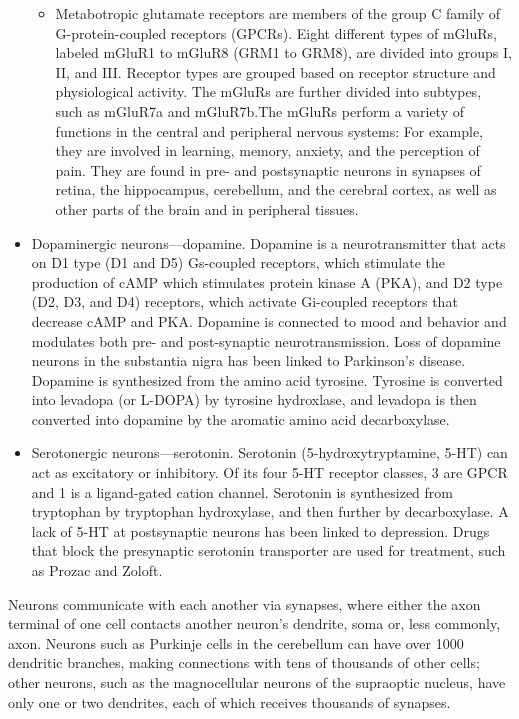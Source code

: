 \begin{itemize}
\begin{itemize}
  \item
    Metabotropic glutamate receptors are members of the group C family of G-protein-coupled receptors (GPCRs).
    Eight different types of mGluRs, labeled mGluR1 to mGluR8 (GRM1 to GRM8), are divided into groups I, II, and III. Receptor types are grouped based on receptor structure and physiological activity. The mGluRs are further divided into subtypes, such as mGluR7a and mGluR7b.The mGluRs perform a variety of functions in the central and peripheral nervous systems: For example, they are involved in learning, memory, anxiety, and the perception of pain. They are found in pre- and postsynaptic neurons in synapses of retina, the hippocampus, cerebellum, and the cerebral cortex, as well as other parts of the brain and in peripheral tissues.
  \end{itemize}
\item
  Dopaminergic neurons---dopamine. Dopamine is a neurotransmitter that acts on D1 type (D1 and D5) Gs-coupled receptors, which stimulate the production of cAMP which stimulates protein kinase A (PKA), and D2 type (D2, D3, and D4) receptors, which activate Gi-coupled receptors that decrease cAMP and PKA. Dopamine is connected to mood and behavior and modulates both pre- and post-synaptic neurotransmission. Loss of dopamine neurons in the substantia nigra has been linked to Parkinson's disease. Dopamine is synthesized from the amino acid tyrosine. Tyrosine is converted into levadopa (or L-DOPA) by tyrosine hydroxlase, and levadopa is then converted into dopamine by the aromatic amino acid decarboxylase.
\item
  Serotonergic neurons---serotonin. Serotonin (5-hydroxytryptamine, 5-HT) can act as excitatory or inhibitory. Of its four 5-HT receptor classes, 3 are GPCR and 1 is a ligand-gated cation channel. Serotonin is synthesized from tryptophan by tryptophan hydroxylase, and then further by decarboxylase. A lack of 5-HT at postsynaptic neurons has been linked to depression. Drugs that block the presynaptic serotonin transporter are used for treatment, such as Prozac and Zoloft.
\end{itemize}

Neurons communicate with each another via synapses, where either the axon terminal of one cell contacts another neuron's dendrite, soma or, less commonly, axon. Neurons such as Purkinje cells in the cerebellum can have over 1000 dendritic branches, making connections with tens of thousands of other cells; other neurons, such as the magnocellular neurons of the supraoptic nucleus, have only one or two dendrites, each of which receives thousands of synapses.

